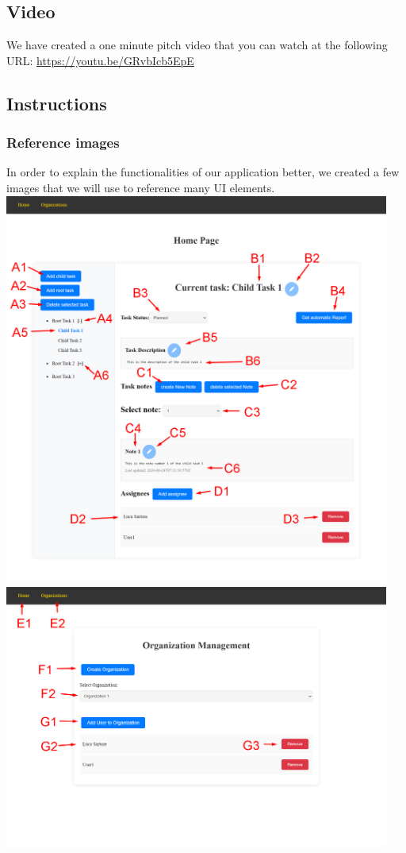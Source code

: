 \documentclass{article}
\begin{document}
\subsection{Video}
We have created a one minute pitch video that you can watch at the following URL: \url{https://youtu.be/GRvbIcb5EpE}

\subsection{Instructions}

\subsubsection{Reference images}
In order to explain the functionalities of our application better, we created a few images that we will use to reference many UI elements.
\newline
\newline
\newline
\includegraphics[width=0.95\textwidth]{images/home_page.jpg}
\newline
\includegraphics[width=0.95\textwidth]{images/organizations_page.jpg}
\end{document}
